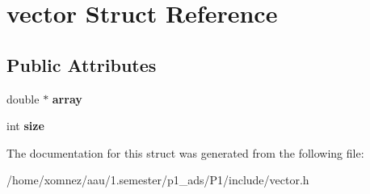 \hypertarget{structvector}{}\section{vector Struct Reference}
\label{structvector}
\subsection*{Public Attributes}
\begin{DoxyCompactItemize}
\item 
\mbox{\label{structvector_aacafbacd712bffb74554a19b617a4c3d}} 
double $\ast$ {\bfseries array}
\item 
\mbox{\label{structvector_a211c6f9096b87e1ff8b09ad5ad373e61}} 
int {\bfseries size}
\end{DoxyCompactItemize}


The documentation for this struct was generated from the following file\+:\begin{DoxyCompactItemize}
\item 
/home/xomnez/aau/1.\+semester/p1\+\_\+ads/\+P1/include/vector.\+h\end{DoxyCompactItemize}
